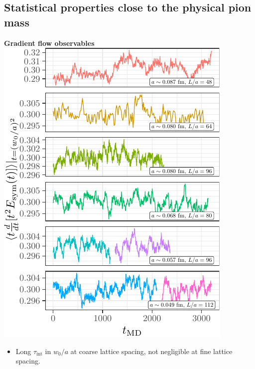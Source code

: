 \documentclass[a0,portrait]{a0poster}
\begin{document}
\begin{multicols}{2}
    \subsection*{Statistical properties close to the physical pion mass}
    \begin{minipage}{0.48\linewidth}
        \centering
        \hspace{2.2cm}\textbf{Gradient flow observables}\\
        \includegraphics[width=\linewidth,page=1]{data/gf_observables/gf_observables_md_histories}
        \begin{itemize}
            \item Long $\tau_\mathrm{int}$ in $w_0/a$ at coarse lattice spacing, not negligible at fine lattice spacing.
        \end{itemize}
    \end{minipage}
    \hfill
    \begin{minipage}{0.48\linewidth}
        \centering

\end{minipage}
\end{multicols}
\end{document}
